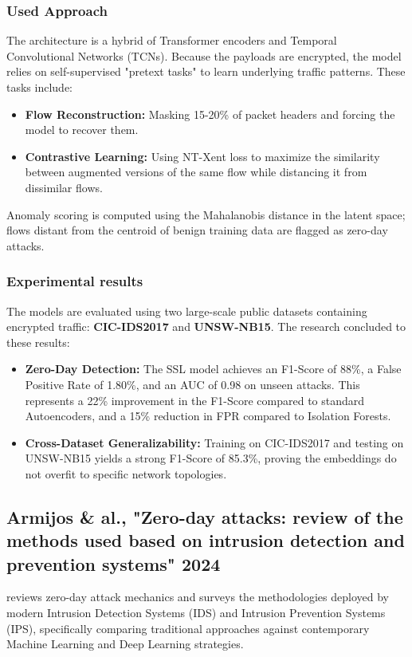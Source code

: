 \documentclass[12pt, a4paper]{report}
\begin{document}
\subsubsection{Used Approach}
The architecture is a hybrid of Transformer encoders and Temporal Convolutional Networks (TCNs). Because the payloads are encrypted, the model relies on self-supervised "pretext tasks" to learn underlying traffic patterns. These tasks include:
\begin{itemize}
    \item \textbf{Flow Reconstruction:} Masking 15-20\% of packet headers and forcing the model to recover them.
    \item \textbf{Contrastive Learning:} Using NT-Xent loss to maximize the similarity between augmented versions of the same flow while distancing it from dissimilar flows.
\end{itemize}
Anomaly scoring is computed using the Mahalanobis distance in the latent space; flows distant from the centroid of benign training data are flagged as zero-day attacks.

\subsubsection{Experimental results}
The models are evaluated using two large-scale public datasets containing encrypted traffic: \textbf{CIC-IDS2017} and \textbf{UNSW-NB15}. The research concluded to these results:
\begin{itemize}
    \item \textbf{Zero-Day Detection:} The SSL model achieves an F1-Score of 88\%, a False Positive Rate of 1.80\%, and an AUC of 0.98 on unseen attacks. This represents a 22\% improvement in the F1-Score compared to standard Autoencoders, and a 15\% reduction in FPR compared to Isolation Forests.
    \item \textbf{Cross-Dataset Generalizability:} Training on CIC-IDS2017 and testing on UNSW-NB15 yields a strong F1-Score of 85.3\%, proving the embeddings do not overfit to specific network topologies.
\end{itemize}

\subsection{Armijos \& al., "Zero-day attacks: review of the methods used based on intrusion detection and prevention systems" 2024}
\cite{armijos2024zeroday} reviews zero-day attack mechanics and surveys the methodologies deployed by modern Intrusion Detection Systems (IDS) and Intrusion Prevention Systems (IPS), specifically comparing traditional approaches against contemporary Machine Learning  and Deep Learning  strategies.
\end{document}
